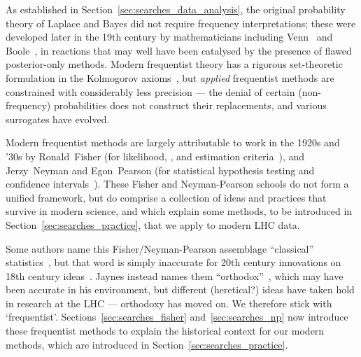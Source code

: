 As established in Section~\ref{sec:searches_data_analysis}, the original
probability theory of Laplace and Bayes did not require frequency
interpretations; these were developed later in the 19th century by
mathematicians including Venn~\cite{venn1866logic} and
Boole~\cite{boole1854investigation}, in reactions that may well have been
catalysed by the presence of flawed posterior-only methods.
Modern frequentist theory has a rigorous set-theoretic formulation in the
Kolmogorov axioms~\cite{
kolomogoroff1933de,
kolomogoroff1950translated,
Neyman1937Outline,
axioms1010038
}, but \emph{applied} frequentist methods are constrained with considerably less
precision --- the denial of certain (non-frequency) probabilities does not
construct their replacements, and various surrogates have evolved.

Modern frequentist methods are largely attributable to work
in the 1920s and '30s by
Ronald~Fisher (for likelihood, \pvalues, and estimation criteria~\cite{
fisher1912fitting,
fisher1915frequency,
fisher1921probable,
fisher1922estimators,
fisher1925smrw,
fisher1956statistical
}),
and Jerzy~Neyman and Egon~Pearson
(for statistical hypothesis testing and confidence intervals~\cite{
neymanpearson1933lemma,
neymanpearson1928max
}).
These Fisher and Neyman-Pearson schools do not form a unified framework, but
do comprise a collection of ideas and practices that survive in modern science,
and which explain some methods, to be introduced in
Section~\ref{sec:searches_practice}, that we apply to modern LHC data.

Some authors name this Fisher/Neyman-Pearson assemblage
``classical'' statistics~\cite{
Neyman1937Outline,
lehmann2011fisher,
Feldman:1997qc
},
but that word is simply inaccurate for 20th century innovations on 18th century
ideas~\cite{
bayes1763lii,
laplace1774stigler
}.
Jaynes instead names them ``orthodox''~\cite{
Jaynes1976intervals,
jaynes2003probability
},
which may have been accurate in his environment, but different
(heretical?) ideas have taken hold in research at the LHC ---
orthodoxy has moved on.
We therefore stick with `frequentist'.
Sections~\ref{sec:searches_fisher} and~\ref{sec:searches_np} now introduce
these frequentist methods to explain the historical context for our modern
methods, which are introduced in Section~\ref{sec:searches_practice}.

